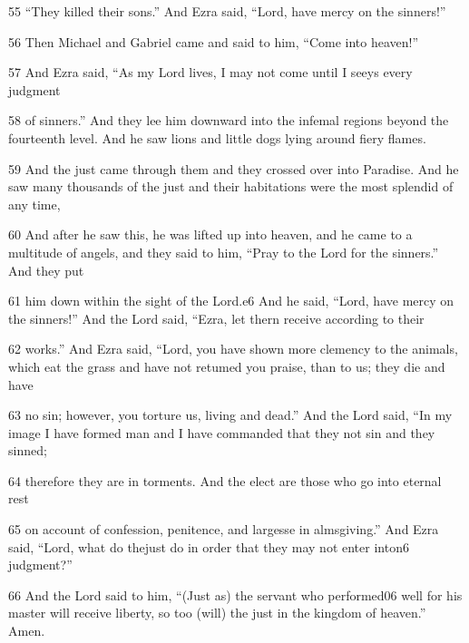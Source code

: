 \par 55 “They killed their sons.” And Ezra said, “Lord, have mercy on the sinners!”

\par 56 Then Michael and Gabriel came and said to him, “Come into heaven!”

\par 57 And Ezra said, “As my Lord lives, I may not come until I seeys every judgment

\par 58 of sinners.” And they lee him downward into the infemal regions beyond the fourteenth level. And he saw lions and little dogs lying around fiery flames.

\par 59 And the just came through them and they crossed over into Paradise. And he saw many thousands of the just and their habitations were the most splendid of any time,

\par 60 And after he saw this, he was lifted up into heaven, and he came to a multitude of angels, and they said to him, “Pray to the Lord for the sinners.” And they put

\par 61 him down within the sight of the Lord.e6 And he said, “Lord, have mercy on the sinners!” And the Lord said, “Ezra, let thern receive according to their

\par 62 works.” And Ezra said, “Lord, you have shown more clemency to the animals, which eat the grass and have not retumed you praise, than to us; they die and have

\par 63 no sin; however, you torture us, living and dead.” And the Lord said, “In my image I have formed man and I have commanded that they not sin and they sinned;

\par 64 therefore they are in torments. And the elect are those who go into eternal rest

\par 65 on account of confession, penitence, and largesse in almsgiving.” And Ezra said, “Lord, what do thejust do in order that they may not enter inton6 judgment?”

\par 66 And the Lord said to him, “(Just as) the servant who performed06 well for his master will receive liberty, so too (will) the just in the kingdom of heaven.” Amen.

